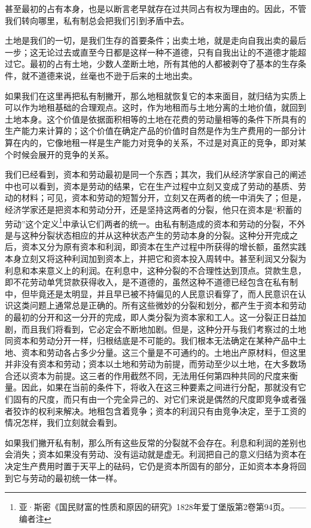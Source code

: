\documentclass[a4paper,twoside,12pt]{ctexart}
\begin{document}
甚至最初的占有本身，也是以断言老早就存在过共同占有权为理由的。因此，不管我们转向哪里，私有制总会把我们引到矛盾中去。

土地是我们的一切，是我们生存的首要条件；出卖土地，就是走向自我出卖的最后一步；这无论过去或直至今日都是这样一种不道德，只有自我出让的不道德才能超过它。最初的占有土地，少数人垄断土地，所有其他的人都被剥夺了基本的生存条件，就不道德来说，丝毫也不逊于后来的土地出卖。

如果我们在这里再把私有制撇开，那么地租就恢复它的本来面目，就归结为实质上可以作为地租基础的合理观点。这时，作为地租而与土地分离的土地价值，就回到土地本身。这个价值是依据面积相等的土地在花费的劳动量相等的条件下所具有的生产能力来计算的；这个价值在确定产品的价值时自然是作为生产费用的一部分计算在内的，它像地租一样是生产能力对竞争的关系，不过是对真正的竞争，即对某个时候会展开的竞争的关系。

我们已经看到，资本和劳动最初是同一个东西；其次，我们从经济学家自己的阐述中也可以看到，资本是劳动的结果，它在生产过程中立刻又变成了劳动的基质、劳动的材料；可见，资本和劳动的短暂分开，立刻又在两者的统一中消失了；但是，经济学家还是把资本和劳动分开，还是坚持这两者的分裂，他只在资本是“积蓄的劳动”这个定义\footnote{亚·斯密《国民财富的性质和原因的研究》1828年爱丁堡版第2卷第94页。——编者注}中承认它们两者的统一。由私有制造成的资本和劳动的分裂，不外是与这种分裂状态相应的并从这种状态产生的劳动本身的分裂。这种分开完成之后，资本又分为原有资本和利润，即资本在生产过程中所获得的增长额，虽然实践本身立刻又将这种利润加到资本上，并把它和资本投入周转中。甚至利润又分裂为利息和本来意义上的利润。在利息中，这种分裂的不合理性达到顶点。贷款生息，即不花劳动单凭贷款获得收入，是不道德的，虽然这种不道德已经包含在私有制中，但毕竟还是太明显，并且早已被不持偏见的人民意识看穿了，而人民意识在认识这类问题上通常总是正确的。所有这些微妙的分裂和划分，都产生于资本和劳动的最初的分开和这一分开的完成，即人类分裂为资本家和工人。这一分裂正日益加剧，而且我们将看到，它必定会不断地加剧。但是，这种分开与我们考察过的土地同资本和劳动分开一样，归根结底是不可能的。我们根本无法确定在某种产品中土地、资本和劳动各占多少分量。这三个量是不可通约的。土地出产原材料，但这里并非没有资本和劳动；资本以土地和劳动为前提，而劳动至少以土地，在大多数场合还以资本为前提。这三者的作用截然不同，无法用任何第四种共同的尺度来衡量。因此，如果在当前的条件下，将收入在这三种要素之间进行分配，那就没有它们固有的尺度，而只有由一个完全异己的、对它们来说是偶然的尺度即竞争或者强者狡诈的权利来解决。地租包含着竞争；资本的利润只有由竞争决定，至于工资的情况怎样，我们立刻就会看到。

如果我们撇开私有制，那么所有这些反常的分裂就不会存在。利息和利润的差别也会消失；资本如果没有劳动、没有运动就是虚无。利润把自己的意义归结为资本在决定生产费用时置于天平上的砝码，它仍是资本所固有的部分，正如资本本身将回到它与劳动的最初统一体一样。
\end{document}
